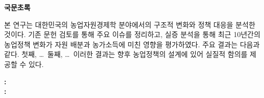 
\begin{center}
    {\LARGE \bfseries 국문초록}
\end{center}


\vspace{1cm}

본 연구는 대한민국의 농업자원경제학 분야에서의 구조적 변화와 정책 대응을 분석한 것이다.
기존 문헌 검토를 통해 주요 이슈를 정리하고, 실증 분석을 통해 최근 10년간의 농업정책 변화가 
자원 배분과 농가소득에 미친 영향을 평가하였다. 주요 결과는 다음과 같다. 첫째, \ldots\ 
둘째, \ldots\ 이러한 결과는 향후 농업정책의 설계에 있어 실질적 함의를 제공할 수 있다.


\noindent
{}
\textbf{:}
\textbf{\abstractkeyword}\\
\textbf{:}
\textbf{\studentnumber}\\
